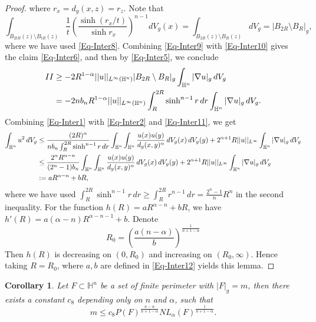 \documentclass[11pt,reqno]{amsart}
\newtheorem{cor}[thm]{Corollary}
\theoremstyle{definition}
\theoremstyle{remark}
\numberwithin{equation}{section}
\renewcommand{\(}{\left(}
\renewcommand{\)}{\right)}
\renewcommand{\-}{\overline}
\begin{document}
\begin{proof}
where $r_x=d_g(x,z)=r_z$. Note that 
\begin{equation}\label{Eq-Inter10}
	\int_{B_{2tR}(z)\setminus B_{tR}(z)}\frac{1}{t}\left(\frac{\sinh(r_x/t)}{\sinh r_x}\right)^{n-1}dV_g(x)=\int_{B_{2R}(z)\setminus B_{R}(z)}dV_g=|B_{2R}\setminus B_R|_g,
\end{equation} 
where we have used \eqref{Eq-Inter8}. Combining \eqref{Eq-Inter9} with \eqref{Eq-Inter10} gives the claim \eqref{Eq-Inter6}, and then by \eqref{Eq-Inter5}, we conclude
\begin{align}
	II&\geq -2R^{1-\alpha}||u||_{L^{\infty}(\mathbb{H}^n)}|B_{2R}\setminus B_R|_g\int_{\mathbb{H}^n}|\nabla u|_g\,dV_g\notag\\
	&=-2n b_n R^{1-\alpha}||u||_{L^{\infty}(\mathbb{H}^n)}\int_R^{2R}\sinh^{n-1}r\,dr\int_{\mathbb{H}^n}|\nabla u|_g\,dV_g.\label{Eq-Inter11}
\end{align}
Combining \eqref{Eq-Inter1} with \eqref{Eq-Inter2} and \eqref{Eq-Inter11}, we get 
\begin{align}
\int_{\mathbb{H}^n}u^2\,dV_g&\leq \frac{(2R)^{\alpha}}{nb_n\int_R^{2R}\sinh^{n-1}r\,dr}\int_{\mathbb{H}^n}\int_{\mathbb{H}^n}\frac{u(x)u(y)}{d_g(x,y)^{\alpha}}\,dV_g(x)\,dV_g(y)+2^{\alpha+1}R||u||_{L^{\infty}}\int_{\mathbb{H}^n}|\nabla u|_g\,dV_g\notag\\
&\leq \frac{2^{\alpha}R^{\alpha-n}}{(2^n-1)b_n}\int_{\mathbb{H}^n}\int_{\mathbb{H}^n}\frac{u(x)u(y)}{d_g(x,y)^{\alpha}}\,dV_g(x)\,dV_g(y)+2^{\alpha+1}R||u||_{L^{\infty}}\int_{\mathbb{H}^n}|\nabla u|_g\,dV_g\notag\\
&:=aR^{\alpha-n}+b R,\label{Eq-Inter12}
\end{align}
where we have used $\int_R^{2R}\sinh^{n-1}r\,dr\geq \int_R^{2R}r^{n-1}\,dr=\frac{2^n-1}{n}R^n$ in the second inequality.
For the function $h(R)=aR^{\alpha-n}+bR$, we have $h'(R)=a(\alpha-n)R^{\alpha-n-1}+b$. Denote
\begin{equation}\label{Eq-Inter13}
	R_0=\left(\frac{a(n-\alpha)}{b}\right)^{\frac{1}{n+1-\alpha}}
\end{equation}
Then $h(R)$ is decreasing on $(0,R_0)$ and increasing on $(R_0,\infty)$. Hence taking $R=R_0$, where $a, b$ are defined in \eqref{Eq-Inter12} yields this lemma. 
\end{proof}
\begin{cor}\label{Cor-Inter}
	Let $F\subset\mathbb{H}^n$ be a set of finite perimeter with $|F|_g=m$, then there exists a constant $c_8$ depending only on $n$ and $\alpha$, such that
	\begin{equation}\label{Cor-Inter1}
		m\leq c_8P(F)^{\frac{n-\alpha}{n+1-\alpha}}NL_{\alpha}(F)^{\frac{1}{n+1-\alpha}}.
	\end{equation}
\end{cor}
\end{document}
